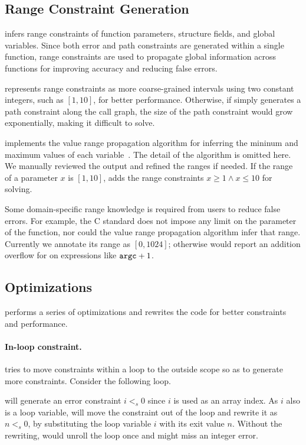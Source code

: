 \subsection{Range Constraint Generation}
\label{s:gen:range}

\sys infers range constraints of function parameters, structure
fields, and global variables.  Since both error and path constraints
are generated within a single function, range constraints are used
to propagate global information across functions for improving
accuracy and reducing false errors.

\sys represents range constraints as more coarse-grained intervals
using two constant integers, such as $[1, 10]$, for better performance.
Otherwise, if \sys simply generates a path constraint along the
call graph, the size of the path constraint would grow exponentially,
making it difficult to solve.

\sys implements the value range propagation algorithm for inferring
the mininum and maximum values of each variable~\cite{patterson:vrp}.
The detail of the algorithm is omitted here.  We manually reviewed
the output and refined the ranges if needed.  If the range of a
parameter $x$ is $[1, 10]$, \sys adds the range constraints $x \geq
1 \land x \leq 10$ for solving.

Some domain-specific range knowledge is required from users to
reduce false errors.  For example, the C standard does not impose
any limit on the  parameter of the  function, nor
could the value range propagation algorithm infer that range.
Currently we annotate its range as $[0, 1024]$; otherwise \sys would
report an addition overflow for on expressions like $\texttt{argc} + 1$.



\subsection{Optimizations}

\sys performs a series of optimizations and rewrites the code for
better constraints and performance.

\paragraph{In-loop constraint.}
\sys tries to move constraints within a loop to the outside scope
so as to generate more constraints.  Consider the following loop.

\sys will generate an error constraint $i <_s 0$ since $i$ is used
as an array index.  As $i$ also is a loop variable, \sys will move
the constraint out of the loop and rewrite it as $n <_s 0$, by
substituting the loop variable $i$ with its exit value $n$.
%
Without the rewriting, \sys would unroll the loop once and might
miss an integer error.


